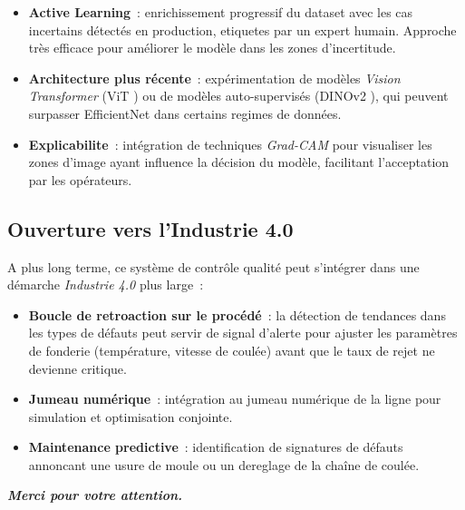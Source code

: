 \documentclass[12pt,a4paper,openany]{report}
\begin{document}
\begin{itemize}
    \item \textbf{Active Learning}~: enrichissement progressif du dataset avec les cas incertains détectés en production, etiquetes par un expert humain. Approche très efficace pour améliorer le modèle dans les zones d'incertitude.
    \item \textbf{Architecture plus récente}~: expérimentation de modèles \emph{Vision Transformer} (ViT \cite{dosovitskiy2020}) ou de modèles auto-supervisés (DINOv2 \cite{oquab2023}), qui peuvent surpasser EfficientNet dans certains regimes de données.
    \item \textbf{Explicabilite}~: intégration de techniques \emph{Grad-CAM} \cite{selvaraju2017} pour visualiser les zones d'image ayant influence la décision du modèle, facilitant l'acceptation par les opérateurs.
\end{itemize}

\subsection{Ouverture vers l'Industrie 4.0}

A plus long terme, ce système de contrôle qualité peut s'intégrer dans une démarche \emph{Industrie 4.0} plus large~:
\begin{itemize}
    \item \textbf{Boucle de retroaction sur le procédé}~: la détection de tendances dans les types de défauts peut servir de signal d'alerte pour ajuster les paramètres de fonderie (température, vitesse de coulée) avant que le taux de rejet ne devienne critique.
    \item \textbf{Jumeau numérique}~: intégration au jumeau numérique de la ligne pour simulation et optimisation conjointe.
    \item \textbf{Maintenance predictive}~: identification de signatures de défauts annoncant une usure de moule ou un dereglage de la chaîne de coulée.
\end{itemize}

\vspace{1.5cm}
\begin{center}
{\Large\bfseries\color{primary} \emph{Merci pour votre attention.}}
\end{center}
\end{document}
